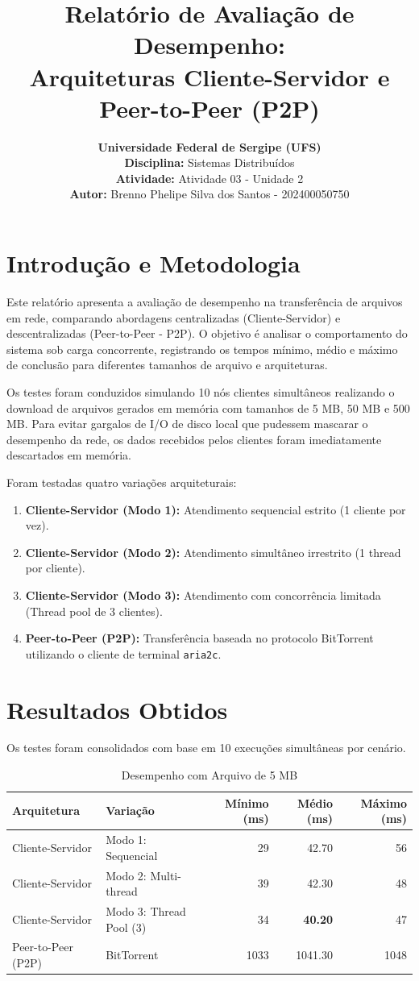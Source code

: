 \documentclass[12pt, a4paper]{article}
\title{\textbf{Relatório de Avaliação de Desempenho:\\Arquiteturas Cliente-Servidor e Peer-to-Peer (P2P)}}
\author{
    \textbf{Universidade Federal de Sergipe (UFS)}\\
    \textbf{Disciplina:} Sistemas Distribuídos\\
    \textbf{Atividade:} Atividade 03 - Unidade 2\\
    \textbf{Autor:} Brenno Phelipe Silva dos Santos -  202400050750
}
\date{}
\begin{document}
\maketitle

\section{Introdução e Metodologia}

Este relatório apresenta a avaliação de desempenho na transferência de arquivos em rede, comparando abordagens centralizadas (Cliente-Servidor) e descentralizadas (Peer-to-Peer - P2P). O objetivo é analisar o comportamento do sistema sob carga concorrente, registrando os tempos mínimo, médio e máximo de conclusão para diferentes tamanhos de arquivo e arquiteturas.

Os testes foram conduzidos simulando 10 nós clientes simultâneos realizando o download de arquivos gerados em memória com tamanhos de 5 MB, 50 MB e 500 MB. Para evitar gargalos de I/O de disco local que pudessem mascarar o desempenho da rede, os dados recebidos pelos clientes foram imediatamente descartados em memória.

Foram testadas quatro variações arquiteturais:
\begin{enumerate}
    \item \textbf{Cliente-Servidor (Modo 1):} Atendimento sequencial estrito (1 cliente por vez).
    \item \textbf{Cliente-Servidor (Modo 2):} Atendimento simultâneo irrestrito (1 thread por cliente).
    \item \textbf{Cliente-Servidor (Modo 3):} Atendimento com concorrência limitada (Thread pool de 3 clientes).
    \item \textbf{Peer-to-Peer (P2P):} Transferência baseada no protocolo BitTorrent utilizando o cliente de terminal \texttt{aria2c}.
\end{enumerate}

\section{Resultados Obtidos}

Os testes foram consolidados com base em 10 execuções simultâneas por cenário.

\begin{table}[h]
    \centering
    \caption{Desempenho com Arquivo de 5 MB}
    \begin{tabular}{llrrr}
        \toprule
        \textbf{Arquitetura} & \textbf{Variação} & \textbf{Mínimo (ms)} & \textbf{Médio (ms)} & \textbf{Máximo (ms)} \\
        \midrule
        Cliente-Servidor & Modo 1: Sequencial & 29 & 42.70 & 56 \\
        Cliente-Servidor & Modo 2: Multi-thread & 39 & 42.30 & 48 \\
        Cliente-Servidor & Modo 3: Thread Pool (3) & 34 & \textbf{40.20} & 47 \\
        Peer-to-Peer (P2P) & BitTorrent & 1033 & 1041.30 & 1048 \\
        \bottomrule
    \end{tabular}
\end{table}
\end{document}
